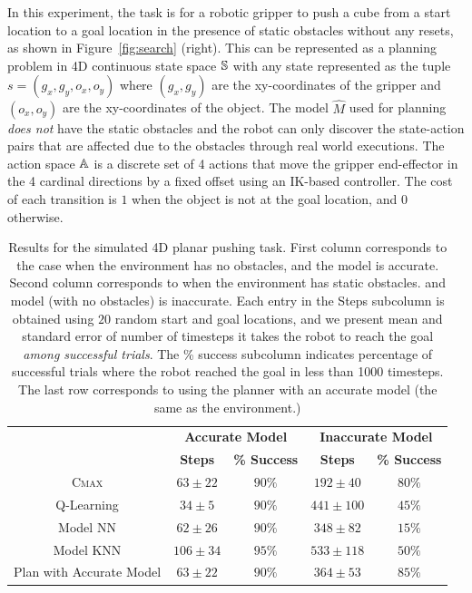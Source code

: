 In this experiment, the task is for a robotic gripper to push a cube
from a start location to a goal location in the presence of
static obstacles without any resets, as shown in
Figure~\ref{fig:search} (right). This can be represented as a
planning problem in 4D continuous state space $\mathbb{S}$ with any state represented as
the tuple $s = (g_x,
g_y, o_x, o_y)$ where $(g_x, g_y)$ are the xy-coordinates of the
gripper and $(o_x, o_y)$ are the xy-coordinates of the object. The
model $\hat{M}$ used for planning \textit{does not} have the static obstacles and the
robot can only discover the state-action pairs that are affected due
to the obstacles through real world executions. The
action space $\mathbb{A}$ is a discrete set of 4 actions that move
the gripper end-effector in the 4 cardinal directions by a fixed
offset using an IK-based controller. The cost of each transition is
$1$ when the object is not at the goal location, and $0$
otherwise.

\begin{table}[t]
  \centering
  \begin{tabular}{|c|c|c|c|c|}
    \hline
    & \multicolumn{2}{c|}{\textbf{Accurate Model}} &
                                                               \multicolumn{2}{c|}{\textbf{Inaccurate
                                                               Model}}
    \\
    \cline{2-5}
    & \textbf{Steps} & \textbf{\% Success} &
                                                    \textbf{Steps}
                          & \textbf{\% Success} \\
    \hline
    \textsc{Cmax} & $63 \pm 22$ & $90\%$ & $192 \pm 40$& $ 80\%$ \\
    \hline
    Q-Learning & $34 \pm 5$ & $90\%$ & $441 \pm 100$ & $45\%$\\
    \hline
    Model NN & $62 \pm 26 $&$90\%$&  $348 \pm 82$&$ 15\%$\\
    \hline
    Model KNN & $106 \pm 34 $&$95\%$& $533 \pm 118 $&$50\%$\\
    \hline
    \hline
    Plan with Accurate Model & $63 \pm 22 $&$90\%$ & $364 \pm 53 $&$85\%$\\
    \hline
  \end{tabular}
  \caption{Results for the simulated 4D planar pushing task. First
    column corresponds to the case when the environment has no
    obstacles, and the model is accurate. Second column corresponds to
    when the environment has static obstacles. and model (with no obstacles) is
    inaccurate. Each entry in the Steps subcolumn is obtained using $20$
    random start and goal locations, and we present mean and standard
    error of number of timesteps it takes the robot to reach the
    goal \textit{among successful trials}. The \% success subcolumn
    indicates percentage of successful trials where the robot reached the goal in less
    than 1000 timesteps. The last row corresponds to using the planner
  with an accurate model (the same as the environment.)}
\label{tab:fetch}

\end{table}

